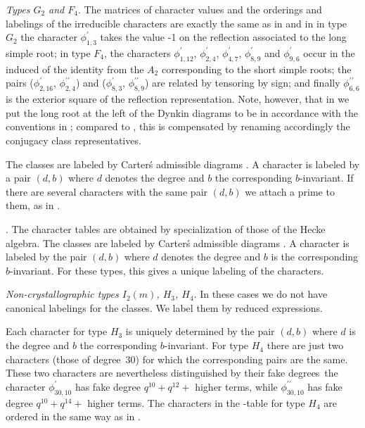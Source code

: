 \smallskip
{\em  Types  $G_2$  and  $F_4$}.  The  matrices of character values and the
orderings  and labelings of the irreducible characters are exactly the same
as  in  \cite[p.412/413]{Car85}  and  in  \cite{Kon65}\:  in type $G_2$ the
character   $\phi_{1,3}^\prime$  takes  the  value  -1  on  the  reflection
associated  to  the  long  simple  root;  in  type  $F_4$,  the  characters
$\phi_{1,12}^\prime$,       $\phi_{2,4}^\prime$,       $\phi_{4,7}^\prime$,
$\phi_{8,9}^\prime$  and $\phi_{9,6}^\prime$  occur in  the induced  of the
identity  from the $A_2$ corresponding to the short simple roots; the pairs
($\phi_{2,16}^\prime$, $\phi_{2,4}^{\prime\prime}$) and
($\phi_{8,3}^\prime$, $\phi_{8,9}^{\prime\prime}$) are related by tensoring
by  sign; and finally $\phi_{6,6}^{\prime\prime}$ is the exterior square of
the  reflection representation. Note, however, that in {\CHEVIE} we put the
long  root at the left of the Dynkin  diagrams to be in accordance with the
conventions  in \cite[(4.8)  and (4.10)]{Lus85};  compared to \cite{Car85},
this   is  compensated   by  renaming   accordingly  the   conjugacy  class
representatives.

The  classes are labeled  by Carter\'s admissible  diagrams \cite{Car72}. A
character is labeled by a pair $(d,b)$ where $d$ denotes the degree and $b$
the  corresponding $b$-invariant. If there  are several characters with the
same pair $(d,b)$ we attach a prime to them, as in \cite{Car85}.

. The character tables are obtained by
specialization  of those of  the Hecke algebra.  The classes are labeled by
Carter\'s  admissible diagrams \cite{Car72}. A  character is labeled by the
pair  $(d,b)$ where  $d$ denotes  the degree  and $b$  is the corresponding
$b$-invariant.  For  these  types,  this  gives  a  unique  labeling of the
characters.

\smallskip
{\em  Non-crystallographic types $I_2(m)$, $H_3$, $H_4$}. In these cases we
do  not have canonical labelings for the  classes. We label them by reduced
expressions.

Each  character for type  $H_3$ is uniquely  determined by the pair $(d,b)$
where  $d$ is the degree and  $b$ the corresponding $b$-invariant. For type
$H_4$  there are just  two characters (those  of degree~$30$) for which the
corresponding  pairs are  the same.  These two  characters are nevertheless
distinguished by their fake degrees\:\ the character
$\phi_{30,10}^\prime$  has  fake  degree  $q^{10}+q^{12}+$  higher terms,
while $\phi_{30,10}^{\prime\prime}$ has fake degree $q^{10}+q^{14}+$ higher
terms.  The characters in  the \CHEVIE-table for  type $H_4$ are ordered in
the same way as in \cite{AL82}.

